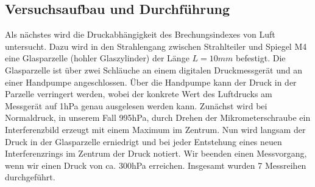 \documentclass[12pt,a4paper]{article}
\begin{document}
\subsection{Versuchsaufbau und Durchführung}
Als nächstes wird die Druckabhängigkeit des Brechungsindexes von Luft untersucht. Dazu wird in den Strahlengang zwischen Strahlteiler und Spiegel M4 eine Glasparzelle (hohler Glaszylinder) der Länge $L=10mm$ befestigt. Die Glasparzelle ist über zwei Schläuche an einem digitalen Druckmessgerät und an einer Handpumpe angeschlossen. Über die Handpumpe kann der Druck in der Parzelle verringert werden, wobei der konkrete Wert des Luftdrucks am Messgerät auf 1hPa genau ausgelesen werden kann. Zunächst wird bei Normaldruck, in unserem Fall 995hPa, durch Drehen der Mikrometerschraube ein Interferenzbild erzeugt mit einem Maximum im Zentrum. Nun wird langsam der Druck in der Glasparzelle erniedrigt und bei jeder Entstehung eines neuen Interferenzrings im Zentrum der Druck notiert. Wir beenden einen Messvorgang, wenn wir einen Druck von ca. 300hPa erreichen. Insgesamt wurden 7 Messreihen durchgeführt.
\end{document}
